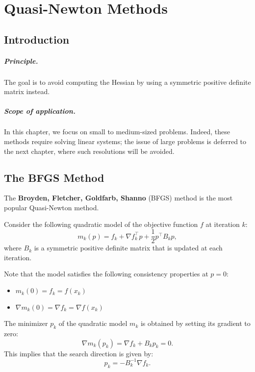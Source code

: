 \chapter{Quasi-Newton Methods}
\label{chap:quasi-newton}

\section{Introduction}

\paragraph{Principle.}
The goal is to avoid computing the Hessian by using a symmetric positive definite matrix instead.

\paragraph{Scope of application.}
In this chapter, we focus on small to medium-sized problems. Indeed, these methods require solving linear systems; the issue of large problems is deferred to the next chapter, where such resolutions will be avoided.

\section{The BFGS Method}
\label{sec:bfgs}

The \textbf{Broyden, Fletcher, Goldfarb, Shanno} (BFGS) method is the most popular Quasi-Newton method.

Consider the following quadratic model of the objective function $f$ at iteration $k$:
\begin{equation}
    m_k(p) = f_k + \nabla f_k^\top p + \frac{1}{2} p^\top B_k p,
\end{equation}
where $B_k$ is a symmetric positive definite matrix that is updated at each iteration.

Note that the model satisfies the following consistency properties at $p=0$:
\begin{itemize}
    \item $m_k(0) = f_k = f(x_k)$
    \item $\nabla m_k(0) = \nabla f_k = \nabla f(x_k)$
\end{itemize}

The minimizer $p_k$ of the quadratic model $m_k$ is obtained by setting its gradient to zero:
\begin{equation}
    \nabla m_k(p_k) = \nabla f_k + B_k p_k = 0.
\end{equation}
This implies that the search direction is given by:
\begin{equation}
    p_k = -B_k^{-1} \nabla f_k.
\end{equation}

